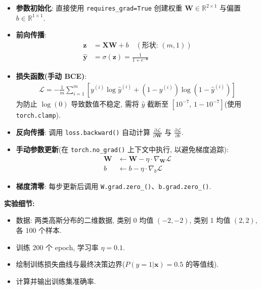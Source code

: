 \documentclass{../../nndlcourse}
\begin{document}
\begin{itemize}
    \item \textbf{参数初始化}: 直接使用 \texttt{requires\_grad=True} 创建权重 $\boldsymbol{W} \in \mathbb{R}^{2 \times 1}$ 与偏置 $b \in \mathbb{R}^{1\times 1}$.
    \item \textbf{前向传播}: 
    \begin{align}
        \boldsymbol{z} &= \boldsymbol{X}\boldsymbol{W} + b \quad (\text{形状: } (m, 1)) \\
        \hat{\boldsymbol{y}} &= \sigma(\boldsymbol{z}) = \frac{1}{1 + e^{-\boldsymbol{z}}}
    \end{align}
    \item \textbf{损失函数(手动 BCE)}: 
    \begin{align}
        \mathcal{L} = -\frac{1}{m}\sum_{i=1}^m \left[y^{(i)}\log\hat{y}^{(i)} + (1-y^{(i)})\log(1-\hat{y}^{(i)})\right]
    \end{align}
    为防止 $\log(0)$ 导致数值不稳定, 需将 $\hat{y}$ 截断至 $[10^{-7},\, 1-10^{-7}]$(使用 \texttt{torch.clamp}).
    \item \textbf{反向传播}: 调用 \texttt{loss.backward()} 自动计算 $\frac{\partial\mathcal{L}}{\partial\boldsymbol{W}}$ 与 $\frac{\partial\mathcal{L}}{\partial b}$.
    \item \textbf{手动参数更新}(在 \texttt{torch.no\_grad()} 上下文中执行, 以避免梯度追踪): 
    \begin{align}
        \boldsymbol{W} &\leftarrow \boldsymbol{W} - \eta \cdot \nabla_{\boldsymbol{W}}\mathcal{L} \\
        b &\leftarrow b - \eta \cdot \nabla_b\mathcal{L}
    \end{align}
    \item \textbf{梯度清零}: 每步更新后调用 \texttt{W.grad.zero\_()}、\texttt{b.grad.zero\_()}.
\end{itemize}

\textbf{实验细节: }
\begin{itemize}
    \item 数据: 两类高斯分布的二维数据, 类别 0 均值 $(-2, -2)$, 类别 1 均值 $(2, 2)$, 各 100 个样本.
    \item 训练 200 个 epoch, 学习率 $\eta = 0.1$.
    \item 绘制训练损失曲线与最终决策边界($P(y=1|\boldsymbol{x})=0.5$ 的等值线).
    \item 计算并输出训练集准确率.
\end{itemize}

\end{document}
